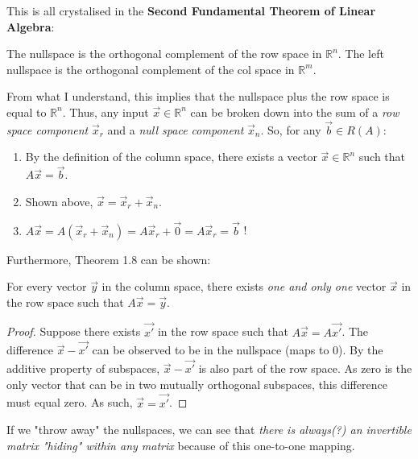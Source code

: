 \documentclass{article}
\begin{document}
This is all crystalised in the \textbf{Second Fundamental Theorem of Linear Algebra}:

\begin{theorem}
    The nullspace is the orthogonal complement of the row space in $\mathbb{R}^n$.
    The left nullspace is the orthogonal complement of the col space in $\mathbb{R}^m$.
\end{theorem}

From what I understand, this implies that the nullspace plus the row space is equal to $\mathbb{R}^n$.
Thus, any input $\vec{x} \in \mathbb{R}^n$ can be broken down into the sum of a \textit{row space component} $\vec{x}_r$ and a \textit{null space component} $\vec{x}_n$.
So, for any $\vec{b} \in R(A)$:
\begin{enumerate}
    \item By the definition of the column space, there exists a vector $\vec{x} \in \mathbb{R}^n$ such that $A\vec{x} = \vec{b}$.
    \item Shown above, $\vec{x} = \vec{x}_r + \vec{x}_n$.
    \item $A\vec{x} = A(\vec{x}_r + \vec{x}_n) = A \vec{x}_r + \vec{0} = A \vec{x}_r = \vec{b}$ !
\end{enumerate}

Furthermore, Theorem 1.8 can be shown:

\begin{theorem}
    For every vector $\vec{y}$ in the column space, there exists \textit{one and only one} vector $\vec{x}$ in the row space such that $A\vec{x} = \vec{y}$.

    \begin{proof}
        Suppose there exists $\vec{x'}$ in the row space such that $A\vec{x} = A\vec{x'}$.
        The difference $\vec{x} - \vec{x'}$ can be observed to be in the nullspace (maps to 0).
        By the additive property of subspaces, $\vec{x} - \vec{x'}$ is also part of the row space.
        As zero is the only vector that can be in two mutually orthogonal subspaces, this difference must equal zero.
        As such, $\vec{x} = \vec{x'}$.
    \end{proof}
\end{theorem}

If we "throw away" the nullspaces, we can see that \textit{there is always(?) an invertible matrix "hiding" within any matrix} because of this one-to-one mapping.
\end{document}
